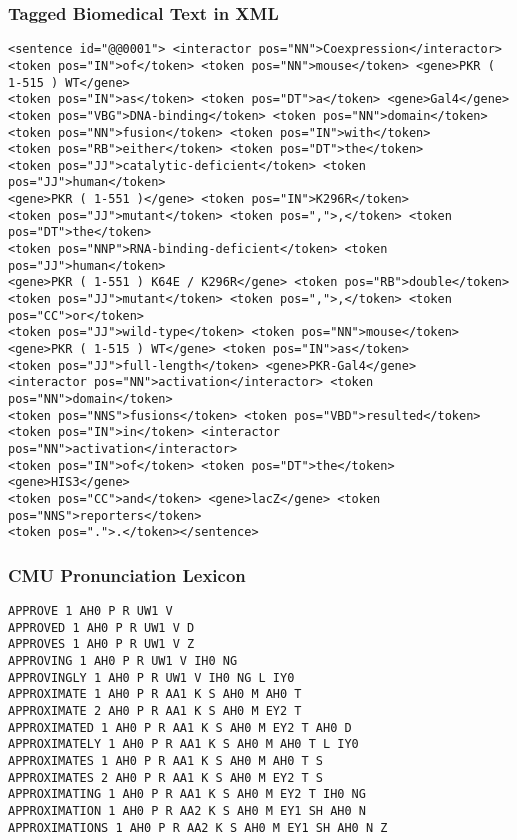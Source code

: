 \documentclass{beamer}             %
\begin{document}
\begin{frame}[fragile]
  \frametitle{Tagged Biomedical Text in XML}
{\tiny\begin{verbatim}
<sentence id="@@0001"> <interactor pos="NN">Coexpression</interactor>
<token pos="IN">of</token> <token pos="NN">mouse</token> <gene>PKR ( 1-515 ) WT</gene>
<token pos="IN">as</token> <token pos="DT">a</token> <gene>Gal4</gene>
<token pos="VBG">DNA-binding</token> <token pos="NN">domain</token>
<token pos="NN">fusion</token> <token pos="IN">with</token>
<token pos="RB">either</token> <token pos="DT">the</token>
<token pos="JJ">catalytic-deficient</token> <token pos="JJ">human</token>
<gene>PKR ( 1-551 )</gene> <token pos="IN">K296R</token>
<token pos="JJ">mutant</token> <token pos=",">,</token> <token pos="DT">the</token>
<token pos="NNP">RNA-binding-deficient</token> <token pos="JJ">human</token>
<gene>PKR ( 1-551 ) K64E / K296R</gene> <token pos="RB">double</token>
<token pos="JJ">mutant</token> <token pos=",">,</token> <token pos="CC">or</token>
<token pos="JJ">wild-type</token> <token pos="NN">mouse</token>
<gene>PKR ( 1-515 ) WT</gene> <token pos="IN">as</token>
<token pos="JJ">full-length</token> <gene>PKR-Gal4</gene>
<interactor pos="NN">activation</interactor> <token pos="NN">domain</token>
<token pos="NNS">fusions</token> <token pos="VBD">resulted</token>
<token pos="IN">in</token> <interactor pos="NN">activation</interactor>
<token pos="IN">of</token> <token pos="DT">the</token> <gene>HIS3</gene>
<token pos="CC">and</token> <gene>lacZ</gene> <token pos="NNS">reporters</token>
<token pos=".">.</token></sentence>
\end{verbatim}}
\end{frame}



\begin{frame}[fragile]
  \frametitle{CMU Pronunciation Lexicon}
{\scriptsize\begin{verbatim}
APPROVE 1 AH0 P R UW1 V
APPROVED 1 AH0 P R UW1 V D
APPROVES 1 AH0 P R UW1 V Z
APPROVING 1 AH0 P R UW1 V IH0 NG
APPROVINGLY 1 AH0 P R UW1 V IH0 NG L IY0
APPROXIMATE 1 AH0 P R AA1 K S AH0 M AH0 T
APPROXIMATE 2 AH0 P R AA1 K S AH0 M EY2 T
APPROXIMATED 1 AH0 P R AA1 K S AH0 M EY2 T AH0 D
APPROXIMATELY 1 AH0 P R AA1 K S AH0 M AH0 T L IY0
APPROXIMATES 1 AH0 P R AA1 K S AH0 M AH0 T S
APPROXIMATES 2 AH0 P R AA1 K S AH0 M EY2 T S
APPROXIMATING 1 AH0 P R AA1 K S AH0 M EY2 T IH0 NG
APPROXIMATION 1 AH0 P R AA2 K S AH0 M EY1 SH AH0 N
APPROXIMATIONS 1 AH0 P R AA2 K S AH0 M EY1 SH AH0 N Z
\end{verbatim}}
\end{frame}
\end{document}
